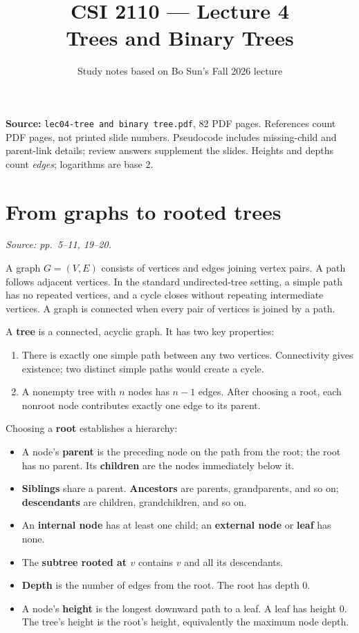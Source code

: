 \documentclass[11pt]{article}
\title{CSI 2110 --- Lecture 4\\Trees and Binary Trees}
\author{Study notes based on Bo Sun's Fall 2026 lecture}
\date{}
\begin{document}
\maketitle
\textbf{Source:} \texttt{lec04-tree and binary tree.pdf}, 82 PDF pages. References count PDF pages, not printed slide numbers. Pseudocode includes missing-child and parent-link details; review answers supplement the slides. Heights and depths count \emph{edges}; logarithms are base $2$.

\section{From graphs to rooted trees}
\textit{Source: pp.\ 5--11, 19--20.}

A graph $G=(V,E)$ consists of vertices and edges joining vertex pairs. A path follows adjacent vertices. In the standard undirected-tree setting, a simple path has no repeated vertices, and a cycle closes without repeating intermediate vertices. A graph is connected when every pair of vertices is joined by a path.

A \textbf{tree} is a connected, acyclic graph. It has two key properties:
\begin{enumerate}
\item There is exactly one simple path between any two vertices. Connectivity gives existence; two distinct simple paths would create a cycle.
\item A nonempty tree with $n$ nodes has $n-1$ edges. After choosing a root, each nonroot node contributes exactly one edge to its parent.
\end{enumerate}

Choosing a \textbf{root} establishes a hierarchy:
\begin{itemize}
\item A node's \textbf{parent} is the preceding node on the path from the root; the root has no parent. Its \textbf{children} are the nodes immediately below it.
\item \textbf{Siblings} share a parent. \textbf{Ancestors} are parents, grandparents, and so on; \textbf{descendants} are children, grandchildren, and so on.
\item An \textbf{internal node} has at least one child; an \textbf{external node} or \textbf{leaf} has none.
\item The \textbf{subtree rooted at $v$} contains $v$ and all its descendants.
\item \textbf{Depth} is the number of edges from the root. The root has depth $0$.
\item A node's \textbf{height} is the longest downward path to a leaf. A leaf has height $0$. The tree's height is the root's height, equivalently the maximum node depth.
\end{itemize}
\end{document}
